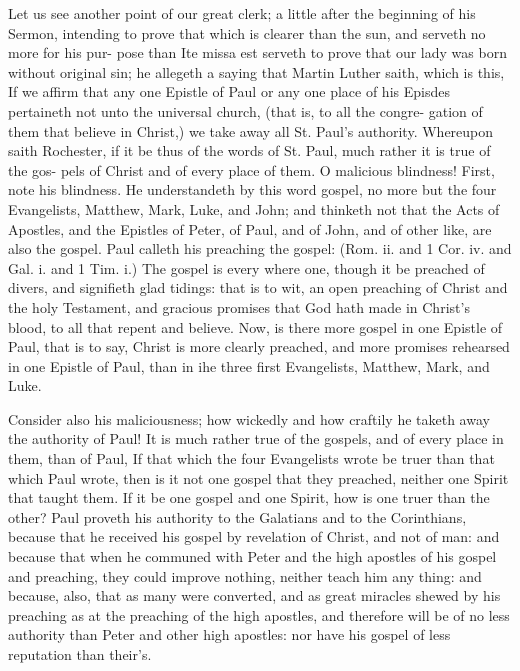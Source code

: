 \documentclass{custom}
\begin{document}
Let us see another point of our great clerk; a little after
the beginning of his Sermon, intending to prove that which
is clearer than the sun, and serveth no more for his pur-
pose than Ite missa est serveth to prove that our lady was 
born without original sin; he allegeth a saying that Martin 
Luther saith, which is this, If we affirm that any one 
Epistle of Paul or any one place of his Episdes pertaineth 
not unto the universal church, (that is, to all the congre- 
gation of them that believe in Christ,) we take away all St. 
Paul's authority. Whereupon saith Rochester, if it be thus 
of the words of St. Paul, much rather it is true of the gos- 
pels of Christ and of every place of them. O malicious 
blindness! First, note his blindness. He understandeth 
by this word gospel, no more but the four Evangelists, 
Matthew, Mark, Luke, and John; and thinketh not that 
the Acts of Apostles, and the Epistles of Peter, of Paul,
and of John, and of other like, are also the gospel. Paul
calleth his preaching the gospel: (Rom. ii. and 1 Cor. iv.
and Gal. i. and 1 Tim. i.) The gospel is every where 
one, though it be preached of divers, and signifieth glad
tidings: that is to wit, an open preaching of Christ and
the holy Testament, and gracious promises that God hath 
made in Christ's blood, to all that repent and believe. 
Now, is there more gospel in one Epistle of Paul, that is to 
say, Christ is more clearly preached, and more promises 
rehearsed in one Epistle of Paul, than in ihe three first 
Evangelists, Matthew, Mark, and Luke. 

Consider also his maliciousness; how wickedly and how 
craftily he taketh away the authority of Paul! It is much 
rather true of the gospels, and of every place in them, than 
of Paul, If that which the four Evangelists wrote be 
truer than that which Paul wrote, then is it not one gospel 
that they preached, neither one Spirit that taught them.
If it be one gospel and one Spirit, how is one truer than 
the other? Paul proveth his authority to the Galatians 
and to the Corinthians, because that he received his gospel 
by revelation of Christ, and not of man: and because that 
when he communed with Peter and the high apostles of 
his gospel and preaching, they could improve nothing, 
neither teach him any thing: and because, also, that as 
many were converted, and as great miracles shewed by his 
preaching as at the preaching of the high apostles, and 
therefore will be of no less authority than Peter and other 
high apostles: nor have his gospel of less reputation 
than their's. 
\end{document}
